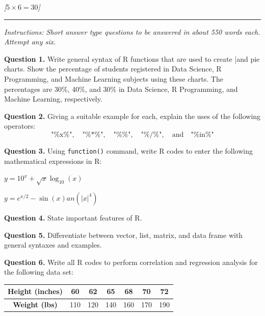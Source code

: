 \documentclass[11pt,a4paper]{article}
\newcommand{\pts}[1]{\hfill   \textit{[#1]}}
\begin{document}
\bigskip


\pts{$5  \times 6 = 30$}
\rule{\linewidth}{0.4pt}\smallskip




\noindent   \textit{Instructions: Short answer type questions to be answered in about 550 words each. Attempt any six.}

\medskip


\noindent   \textbf{Question 1.} Write general syntax of R functions that are used to create \bar and pie charts. Show the percentage of students registered in Data Science, R Programming, and Machine Learning subjects using these charts. The percentages are 30\%, 40\%, and 30\% in Data Science, R Programming, and Machine Learning, respectively.

\medskip


\noindent   \textbf{Question 2.} Giving a suitable example for each, explain the uses of the following operators:
\[
 \text{"\%x\%"}, \quad  \text{"\%*\%"}, \quad  \text{"\%\%"}, \quad  \text{"\%/\%"}, \quad  \text{and} \quad  \text{"\%in\%"}
\]

\medskip


\noindent   \textbf{Question 3.} Using   \texttt{function()} command, write R codes to enter the following mathematical expressions in R:

\begin{parts}
  \item $y = 10^x + \sqrt{x}\log_{10}(x)$
  \item $y = e^{x/2} - \sin(x) an(|x|^4)$
\end{parts}

\medskip


\noindent   \textbf{Question 4.} State important features of R.

\medskip


\noindent   \textbf{Question 5.} Differentiate between vector, list, matrix, and data frame with general syntaxes and examples.

\medskip


\noindent   \textbf{Question 6.} Write all R codes to perform correlation and regression analysis for the following data set:

\begin{center}

\begin{tabular}{|c|c|c|c|c|c|c|}
\hline
   \textbf{Height (inches)} & 60 & 62 & 65 & 68 & 70 & 72 \\ \hline
   \textbf{Weight (lbs)} & 110 & 120 & 140 & 160 & 170 & 190 \\ \hline
\end{tabular}
\end{center}
\end{document}
